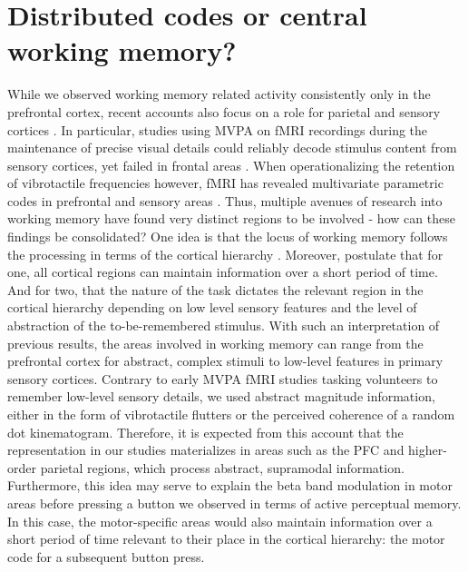 \section{Distributed codes or central working memory?}
While we observed working memory related activity consistently only in the prefrontal cortex, recent accounts also focus on a role for parietal and sensory cortices \parencite{Bettencourt2015,Christophel2017,Sreenivasan2014,Xu2015}. In particular, studies using MVPA on fMRI recordings during the maintenance of precise visual details could reliably decode stimulus content from sensory cortices, yet failed in frontal areas \parencite{Christophel2012,Emrich2013,Riggall2012}. When operationalizing the retention of vibrotactile frequencies however, fMRI has revealed multivariate parametric codes in prefrontal and sensory areas \parencite{Schmidt2017,Wu2018}. Thus, multiple avenues of research into working memory have found very distinct regions to be involved - how can these findings be consolidated?
One idea is that the locus of working memory follows the processing in terms of the cortical hierarchy \parencite{Eriksson2015,Fuster2012,Zimmer2008}. Moreover, \textcite{Christophel2017} postulate that for one, all cortical regions can maintain information over a short period of time. And for two, that the nature of the task dictates the relevant region in the cortical hierarchy depending on low level sensory features and the level of abstraction of the to-be-remembered stimulus. With such an interpretation of previous results, the areas involved in working memory can range from the prefrontal cortex for abstract, complex stimuli to low-level features in primary sensory cortices. Contrary to early MVPA fMRI studies tasking volunteers to remember low-level sensory details, we used abstract magnitude information, either in the form of vibrotactile flutters or the perceived coherence of a random dot kinematogram. Therefore, it is expected from this account that the representation in our studies materializes in areas such as the PFC and higher-order parietal regions, which process abstract, supramodal information. Furthermore, this idea may serve to explain the beta band modulation in motor areas before pressing a button we observed in terms of active perceptual memory. In this case, the motor-specific areas would also maintain information over a short period of time relevant to their place in the cortical hierarchy: the motor code for a subsequent button press.

